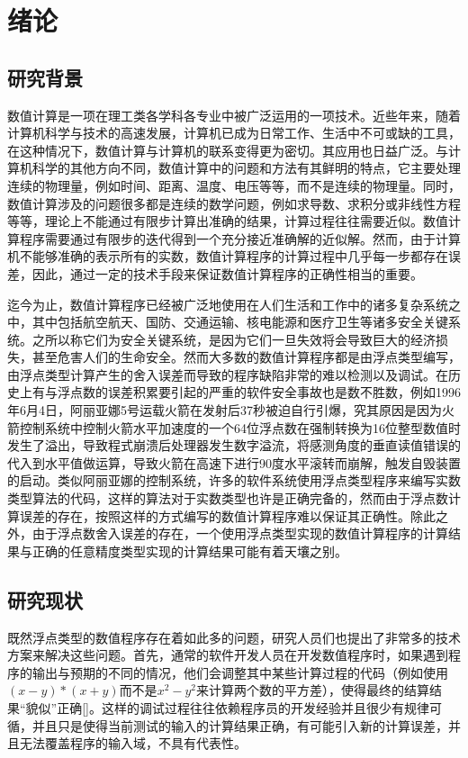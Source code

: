 \chapter{绪论}\label{chapter_introduction}

\section{研究背景}

数值计算是一项在理工类各学科各专业中被广泛运用的一项技术。近些年来，随着计算机科学与技术的高速发展，计算机已成为日常工作、生活中不可或缺的工具，在这种情况下，数值计算与计算机的联系变得更为密切。其应用也日益广泛。与计算机科学的其他方向不同，数值计算中的问题和方法有其鲜明的特点，它主要处理连续的物理量，例如时间、距离、温度、电压等等，而不是连续的物理量。同时，数值计算涉及的问题很多都是连续的数学问题，例如求导数、求积分或非线性方程等等，理论上不能通过有限步计算出准确的结果，计算过程往往需要近似。数值计算程序需要通过有限步的迭代得到一个充分接近准确解的近似解。然而，由于计算机不能够准确的表示所有的实数，数值计算程序的计算过程中几乎每一步都存在误差，因此，通过一定的技术手段来保证数值计算程序的正确性相当的重要。

迄今为止，数值计算程序已经被广泛地使用在人们生活和工作中的诸多复杂系统之中，其中包括航空航天、国防、交通运输、核电能源和医疗卫生等诸多安全关键系统。之所以称它们为安全关键系统，是因为它们一旦失效将会导致巨大的经济损失，甚至危害人们的生命安全。然而大多数的数值计算程序都是由浮点类型编写，由浮点类型计算产生的舍入误差而导致的程序缺陷非常的难以检测以及调试。在历史上有与浮点数的误差积累要引起的严重的软件安全事故也是数不胜数，例如1996年6月4日，阿丽亚娜5号运载火箭在发射后37秒被迫自行引爆，究其原因是因为火箭控制系统中控制火箭水平加速度的一个64位浮点数在强制转换为16位整型数值时发生了溢出，导致程式崩溃后处理器发生数字溢流，将感测角度的垂直读值错误的代入到水平值做运算，导致火箭在高速下进行90度水平滚转而崩解，触发自毁装置的启动。类似阿丽亚娜的控制系统，许多的软件系统使用浮点类型程序来编写实数类型算法的代码，这样的算法对于实数类型也许是正确完备的，然而由于浮点数计算误差的存在，按照这样的方式编写的数值计算程序难以保证其正确性。除此之外，由于浮点数舍入误差的存在，一个使用浮点类型实现的数值计算程序的计算结果与正确的任意精度类型实现的计算结果可能有着天壤之别。

\section{研究现状}

既然浮点类型的数值程序存在着如此多的问题，研究人员们也提出了非常多的技术方案来解决这些问题。首先，通常的软件开发人员在开发数值程序时，如果遇到程序的输出与预期的不同的情况，他们会调整其中某些计算过程的代码（例如使用$(x-y)*(x+y)$而不是$x^2-y^2$来计算两个数的平方差），使得最终的结算结果“貌似”正确[]。这样的调试过程往往依赖程序员的开发经验并且很少有规律可循，并且只是使得当前测试的输入的计算结果正确，有可能引入新的计算误差，并且无法覆盖程序的输入域，不具有代表性。

